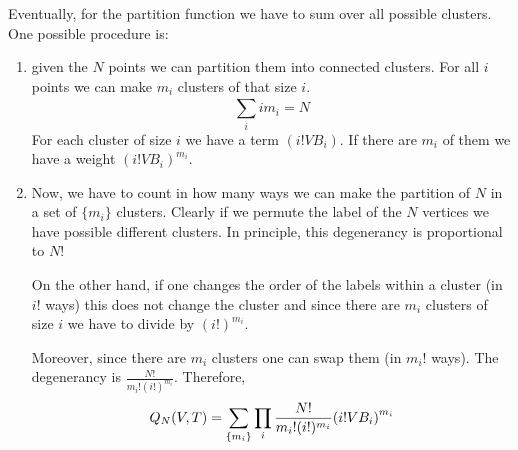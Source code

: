 \documentclass[../../Main/Main.tex]{subfiles}
\begin{document}
Eventually, for the partition function we have to sum over all possible clusters.
One possible procedure is:
\begin{enumerate}
\item given the \( N \) points we can partition them into connected clusters. For all \( i \) points we can make \( m_i \) clusters of that size \( i \).
\begin{equation*}
  \sum_{i}^{} i m_i = N
\end{equation*}
For each cluster of size \( i \) we have a term \( (i!VB_i) \). If there are \( m_i \) of them we have a weight \( (i! V B_i)^{m_i} \).
\item Now, we have to count in how many ways we can make the partition of \( N \) in a set of \( \{ m_i \}   \) clusters. Clearly if we permute the label of the \( N \) vertices we have possible different clusters. In principle, this degenerancy is proportional to \( N \)!

On the other hand, if one changes the order of the labels within a cluster (in \( i! \) ways) this does not change the cluster and since there are \( m_i \) clusters of size \( i \) we have to divide by \( (i!)^{m_i} \).

Moreover, since there are \( m_i \) clusters one can swap them (in \( m_i! \) ways). The degenerancy is \( \frac{N!}{m_i! (i!)^{m_i}} \). Therefore,
\begin{equation}
  Q_N (V,T) = \sum_{\{ m_i \}  }^{} \prod_{i}^{}    \frac{N!}{m_i! (i!)^{m_i}} \qty(i! V B_i)^{m_i}
\end{equation}
\end{enumerate}
\end{document}
